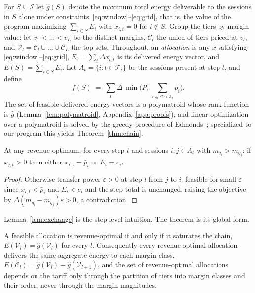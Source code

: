 \documentclass[manuscript, screen, review, anonymous]{acmart}
\begin{document}
For $S\subseteq\mathcal{I}$ let $\hat g(S)$ denote the maximum total energy deliverable to the sessions in $S$ alone under constraints~\eqref{eq:window}--\eqref{eq:grid}, that is, the value of the program maximizing $\sum_{i\in S}E_i$ with $x_{i,t}=0$ for $i\notin S$. Group the tiers by margin value: let $v_1<\dots<v_L$ be the distinct margins, $\mathcal{C}_l$ the union of tiers priced at $v_l$, and $\mathcal{V}_l=\mathcal{C}_l\cup\dots\cup \mathcal{C}_L$ the top sets. Throughout, an \emph{allocation} is any $x$ satisfying \eqref{eq:window}--\eqref{eq:grid}, $E_i=\sum_t\Delta x_{i,t}$ is its delivered energy vector, and $E(S)=\sum_{i\in S}E_i$. Let $A_t=\{i:t\in\mathcal{T}_i\}$ be the sessions present at step $t$, and define
\begin{equation}
f(S)\;=\;\sum_{t}\Delta\,\min\!\Big(P,\ \sum_{i\in S\cap A_t}\bar p_i\Big).
\label{eq:rank}
\end{equation}
The set of feasible delivered-energy vectors is a polymatroid whose rank function is $\hat g$ (Lemma~\ref{lem:polymatroid}, Appendix~\ref{app:proofs}), and linear optimization over a polymatroid is solved by the greedy procedure of Edmonds~\cite{edmonds2003submodular}; specialized to our program this yields Theorem~\ref{thm:chain}.

\begin{lemma}[Exchange]\label{lem:exchange}
At any revenue optimum, for every step $t$ and sessions $i,j\in A_t$ with $m_{g_i}>m_{g_j}$: if $x_{j,t}>0$ then either $x_{i,t}=\bar p_i$ or $E_i=e_i$.
\end{lemma}

\begin{proof}
Otherwise transfer power $\varepsilon>0$ at step $t$ from $j$ to $i$, feasible for small $\varepsilon$ since $x_{i,t}<\bar p_i$ and $E_i<e_i$ and the step total is unchanged, raising the objective by $\Delta(m_{g_i}-m_{g_j})\varepsilon>0$, a contradiction.
\end{proof}

Lemma~\ref{lem:exchange} is the step-level intuition. The theorem is its global form.

\begin{theorem}\label{thm:chain}
A feasible allocation is revenue-optimal if and only if it saturates the chain, $E(\mathcal{V}_l)=\hat g(\mathcal{V}_l)$ for every $l$. Consequently every revenue-optimal allocation delivers the same aggregate energy to each margin class, $E(\mathcal{C}_l)=\hat g(\mathcal{V}_l)-\hat g(\mathcal{V}_{l+1})$, and the set of revenue-optimal allocations depends on the tariff only through the partition of tiers into margin classes and their order, never through the margin magnitudes.
\end{theorem}
\end{document}
